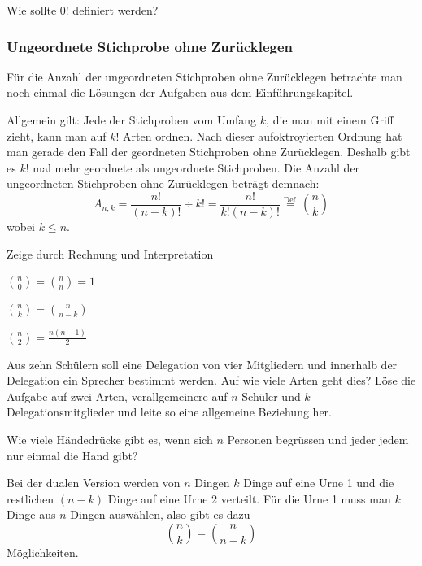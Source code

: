 \documentclass[%
11pt,%
twoside,%
titlepage,%
german,%
headsepline%
]{scrartcl}
\begin{document}
\begin{ueb}[Sonderfall]
Wie sollte $0!$ definiert werden?
\end{ueb}

\subsubsection{Ungeordnete Stichprobe ohne Zurücklegen}
Für die Anzahl der ungeordneten Stichproben ohne Zurücklegen betrachte man noch einmal die Lösungen der Aufgaben aus dem Einführungskapitel.

Allgemein gilt: Jede der Stichproben vom Umfang $k$, die man mit einem Griff zieht, kann man auf $k!$ Arten ordnen. Nach dieser aufoktroyierten Ordnung hat man gerade den Fall der geordneten Stichproben ohne Zurücklegen. Deshalb gibt es $k!$ mal mehr geordnete als ungeordnete Stichproben.
Die Anzahl der ungeordneten Stichproben ohne Zurücklegen beträgt demnach:
$$A_{n,k}=\frac{n!}{(n-k)!}\div k!=\frac{n!}{k!(n-k)!}\stackrel{\text{Def.}}{=}\binom{n}{k}$$
wobei $k\leq n$.

\begin{ueb}[Binomialkoeffizienten]

Zeige durch Rechnung und Interpretation
\begin{enumeratea}
\item $\binom{n}{0}=\binom{n}{n}=1$
\item $\binom{n}{k}=\binom{n}{n-k}$
\item $\binom{n}{2}=\frac{n(n-1)}{2}$
\end{enumeratea}
\end{ueb}

\begin{ueb}[Delegation]
Aus zehn Schülern soll eine Delegation von vier Mitgliedern und innerhalb der Delegation ein Sprecher bestimmt werden. Auf wie viele Arten geht dies? Löse die Aufgabe auf zwei Arten, verallgemeinere auf $n$ Schüler und $k$ Delegationsmitglieder und leite so eine allgemeine Beziehung her.
\end{ueb}

\begin{ueb}
Wie viele Händedrücke gibt es, wenn sich $n$ Personen begrüssen und jeder jedem nur einmal die Hand gibt?
\end{ueb}

Bei der dualen Version werden von $n$ Dingen $k$ Dinge auf eine Urne 1 und die restlichen $(n-k)$ Dinge auf eine Urne 2 verteilt. Für die Urne 1 muss man $k$ Dinge aus $n$
Dingen auswählen, also gibt es dazu
$$\binom{n}{k}=\binom{n}{n-k}$$
Möglichkeiten.
\end{document}
